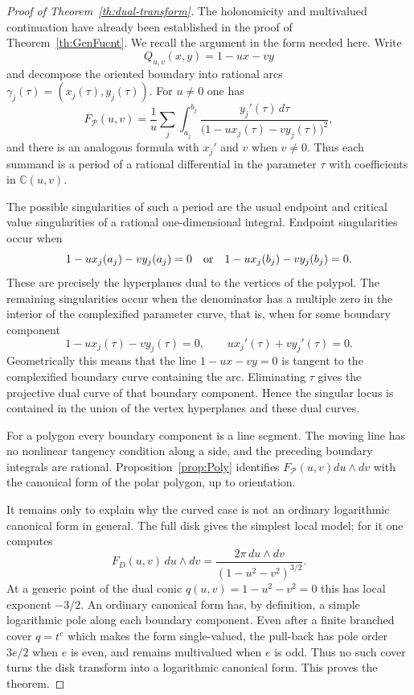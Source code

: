 \documentclass[10pt,a4paper,reqno]{amsart}
\newcommand {\bC} {\mathbb {C}}
\newcommand {\cP} {\mathcal P}
\theoremstyle{plain}
\theoremstyle{definition}
\begin{document}
\begin{proof}[Proof of Theorem~\ref{th:dual-transform}]
The holonomicity and multivalued continuation have already been established in
the proof of Theorem~\ref{th:GenFucnt}.  We recall the argument in the form
needed here.  Write
\[
        Q_{u,v}(x,y)=1-ux-vy
\]
and decompose the oriented boundary into rational arcs
$\gamma_j(\tau)=(x_j(\tau),y_j(\tau))$.  For $u\ne0$ one has
\[
 F_{\cP}(u,v)=\frac{1}{u}
       \sum_j\int_{a_j}^{b_j}
       \frac{y_j'(\tau)\,d\tau}
       {\bigl(1-u x_j(\tau)-v y_j(\tau)\bigr)^2},
\]
and there is an analogous formula with $x_j'$ and $v$ when $v\ne0$.  Thus each
summand is a period of a rational differential in the parameter $\tau$ with
coefficients in $\bC(u,v)$.

The possible singularities of such a period are the usual endpoint and critical
value singularities of a rational one-dimensional integral.  Endpoint
singularities occur when
\[
        1-u x_j(a_j)-v y_j(a_j)=0
        \quad\hbox{or}\quad
        1-u x_j(b_j)-v y_j(b_j)=0.
\]
These are precisely the hyperplanes dual to the vertices of the polypol.  The
remaining singularities occur when the denominator has a multiple zero in the
interior of the complexified parameter curve, that is, when for some boundary
component
\[
        1-u x_j(\tau)-v y_j(\tau)=0,
        \qquad
        u x_j'(\tau)+v y_j'(\tau)=0.
\]
Geometrically this means that the line $1-ux-vy=0$ is tangent to the
complexified boundary curve containing the arc.  Eliminating $\tau$ gives the
projective dual curve of that boundary component.  Hence the singular locus is
contained in the union of the vertex hyperplanes and these dual curves.

For a polygon every boundary component is a line segment.  The moving line has
no nonlinear tangency condition along a side, and the preceding boundary
integrals are rational.  Proposition~\ref{prop:Poly} identifies
$F_{\cP}(u,v)du\wedge dv$ with the canonical form of the polar polygon, up to
orientation.

It remains only to explain why the curved case is not an ordinary logarithmic
canonical form in general.  The full disk gives the simplest local model; for it one computes
\[
        F_D(u,v)\,du\wedge dv=
        \frac{2\pi\,du\wedge dv}{(1-u^2-v^2)^{3/2}}.
\]
At a generic point of the dual conic $q(u,v)=1-u^2-v^2=0$ this has local
exponent $-3/2$.  An ordinary canonical form has, by definition, a simple
logarithmic pole along each boundary component.  Even after a finite branched
cover $q=t^e$ which makes the form single-valued, the pull-back has pole order
$3e/2$ when $e$ is even, and remains multivalued when $e$ is odd.  Thus no such
cover turns the disk transform into a logarithmic canonical form.  This proves
the theorem.
\end{proof}
\end{document}
